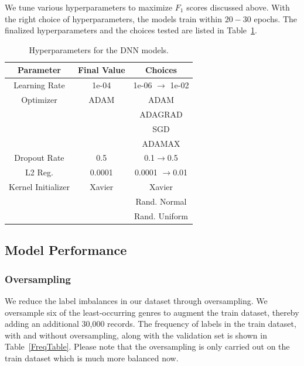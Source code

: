 \documentclass[10pt]{article}
\begin{document}
We tune various hyperparameters to maximize $F_1$ scores discussed above. With the right choice of hyperparameters, the models train within $20-30$ epochs. The finalized hyperparameters and the choices tested are listed in Table~\ref{HyperparameterTable}. 

\begin{table}[h]
\begin{center}
\begin{tabular}{ccc}
\hline \bf Parameter & \bf Final Value  & \bf Choices  \\  
\hline
Learning Rate & 1e-04 &  1e-06 $\rightarrow$ 1e-02 \\
Optimizer & ADAM & ADAM \\
 & & ADAGRAD \\
 & & SGD \\
 & & ADAMAX \\
Dropout Rate & 0.5 & 0.1$\rightarrow$0.5 \\
L2 Reg. & 0.0001 & 0.0001 $\rightarrow$0.01 \\
Kernel Initializer & Xavier &  Xavier \\
& & Rand. Normal \\
& & Rand. Uniform \\
\hline
\end{tabular}
\end{center}
\captionsetup{justification=centering}
\caption{\label{HyperparameterTable} Hyperparameters for the DNN models. }
\end{table}

\subsection{Model Performance}

\subsubsection{Oversampling}
We reduce the label imbalances in our dataset through oversampling. We oversample six of the least-occurring genres to augment the train dataset, thereby adding an additional 30,000 records. The frequency of labels in the train dataset, with and without oversampling, along with the validation set is shown in Table~\ref{FreqTable}. Please note that the oversampling is only carried out on the train dataset which is much more balanced now. 
\end{document}
